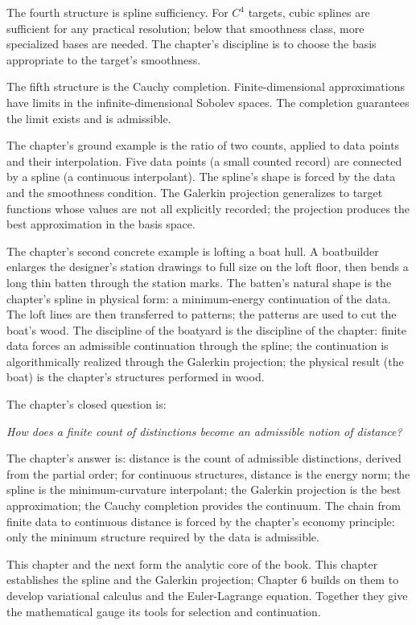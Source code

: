 \begin{chapteressay}
The fourth structure is spline sufficiency. For $C^4$ targets,
cubic splines are sufficient for any practical resolution; below
that smoothness class, more specialized bases are needed. The
chapter's discipline is to choose the basis appropriate to the
target's smoothness.

The fifth structure is the Cauchy completion. Finite-dimensional
approximations have limits in the infinite-dimensional Sobolev
spaces. The completion guarantees the limit exists and is
admissible.

The chapter's ground example is the ratio of two counts, applied
to data points and their interpolation. Five data points (a small
counted record) are connected by a spline (a continuous
interpolant). The spline's shape is forced by the data and the
smoothness condition. The Galerkin projection generalizes to
target functions whose values are not all explicitly recorded; the
projection produces the best approximation in the basis space.

The chapter's second concrete example is lofting a boat hull. A
boatbuilder enlarges the designer's station drawings to full
size on the loft floor, then bends a long thin batten through the
station marks. The batten's natural shape is the chapter's spline
in physical form: a minimum-energy continuation of the data. The
loft lines are then transferred to patterns; the patterns are
used to cut the boat's wood. The discipline of the boatyard is
the discipline of the chapter: finite data forces an admissible
continuation through the spline; the continuation is
algorithmically realized through the Galerkin projection; the
physical result (the boat) is the chapter's structures performed
in wood.

The chapter's closed question is:

\begin{center}
\emph{How does a finite count of distinctions become an admissible
notion of distance?}
\end{center}

The chapter's answer is: distance is the count of admissible
distinctions, derived from the partial order; for continuous
structures, distance is the energy norm; the spline is the
minimum-curvature interpolant; the Galerkin projection is the
best approximation; the Cauchy completion provides the continuum.
The chain from finite data to continuous distance is forced
by the chapter's economy principle: only the minimum structure
required by the data is admissible.

This chapter and the next form the analytic core of the book. This
chapter establishes the spline and the Galerkin projection;
Chapter 6 builds on them to develop variational calculus and the
Euler-Lagrange equation. Together they give the mathematical gauge
its tools for selection and continuation.

\end{chapteressay}

